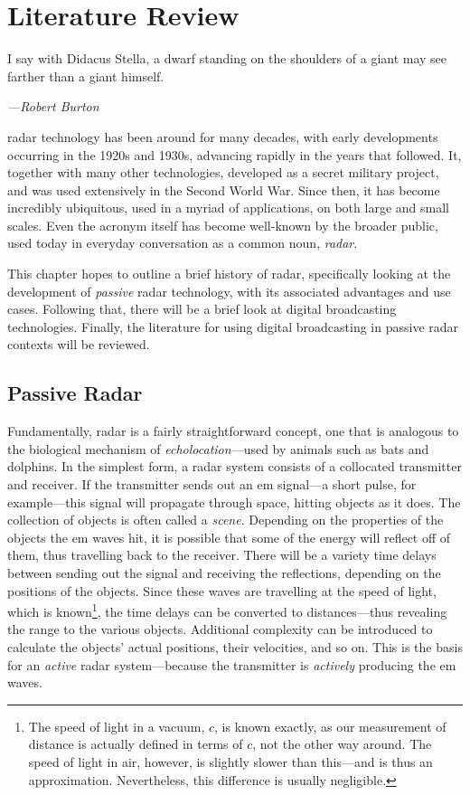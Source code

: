 \documentclass[class=report,11pt,crop=false]{standalone}
\begin{document}
\tableofcontents

\chapter{Literature Review}
\epigraph{I say with Didacus Stella, a dwarf standing on the shoulders of a giant may see farther than a giant himself.}%
    {\emph{---Robert Burton}}

\gls{radar} technology has been around for many decades, with early developments occurring in the 1920s and 1930s, advancing rapidly in the years that followed. It, together with many other technologies, developed as a secret military project, and was used extensively in the Second World War. Since then, it has become incredibly ubiquitous, used in a myriad of applications, on both large and small scales. Even the acronym itself has become well-known by the broader public, used today in everyday conversation as a common noun, \emph{radar}.

This chapter hopes to outline a brief history of radar, specifically looking at the development of \emph{passive} radar technology, with its associated advantages and use cases. Following that, there will be a brief look at digital broadcasting technologies. Finally, the literature for using digital broadcasting in passive radar contexts will be reviewed.

\section{Passive Radar}

Fundamentally, radar is a fairly straightforward concept, one that is analogous to the biological mechanism of \emph{echolocation}---used by animals such as bats and dolphins. In the simplest form, a radar system consists of a collocated transmitter and receiver. If the transmitter sends out an \gls{em} signal---a short pulse, for example---this signal will propagate through space, hitting objects as it does. The collection of objects is often called a \emph{scene}. Depending on the properties of the objects the \gls{em} waves hit, it is possible that some of the energy will reflect off of them, thus travelling back to the receiver. There will be a variety time delays between sending out the signal and receiving the reflections, depending on the positions of the objects. Since these waves are travelling at the speed of light, which is known\footnote{The speed of light in a vacuum, \(c\), is known exactly, as our measurement of distance is actually defined in terms of \(c\), not the other way around. The speed of light in air, however, is slightly slower than this---and is thus an approximation. Nevertheless, this difference is usually negligible.}, the time delays can be converted to distances---thus revealing the range to the various objects. Additional complexity can be introduced to calculate the objects' actual positions, their velocities, and so on. This is the basis for an \emph{active} radar system---because the transmitter is \emph{actively} producing the \gls{em} waves.
\end{document}
